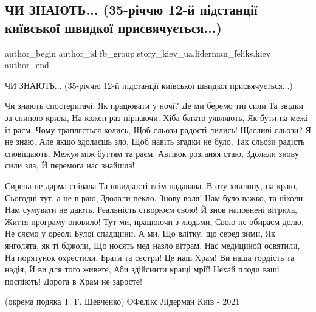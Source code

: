  
 
 
 
 
 
\subsection{ЧИ ЗНАЮТЬ... (35-річчю 12-й підстанції київської швидкої присвячується...)}
\label{sec:03_12_2021.fb.fb_group.story_kiev_ua.1.35_letie_skoraja}
 
\ifcmt
 author_begin
   author_id fb_group.story_kiev_ua,liderman_feliks.kiev
 author_end
\fi

ЧИ ЗНАЮТЬ... (35-річчю 12-й підстанції київської швидкої присвячується...)

\begin{multicols}{3} %
\setlength{\parindent}{0pt}
\obeycr
Чи знають спостеригачі, 
Як працювати у ночі?
Де ми беремо тиї сили
Та звідки за спиною крила, 
На кожен раз пірнаючи.
Хіба багато уявляють, 
Як бути на межі із раєм,
Чому трапляється колись, 
Щоб сльози радості лились! 
Щасливі сльози? Я не знаю. 
Але якщо здолаєшь зло, 
Щоб навіть згадки не було, 
Так сльози радість сповіщають.
Межуя між буттям та раєм, 
Автівок розганяя стаю, 
Здолали знову сили зла,
Й перемога нас знайшла!
\restorecr
\end{multicols} %


\begin{multicols}{3} %
\setlength{\parindent}{0pt}
\obeycr
Сирена не дарма співала
Та швидкості всім надавала. 
В оту хвилину, на краю, 
Сьогодні тут, а не в раю, 
Здолали пекло. Знову воля! 
Нам було важко, та ніколи 
Нам сумувати не дають. 
Реальність створюєм свою! 
Й знов наповнені вітрила, 
Життя програму оновило! 
Тут ми, працюючи з людьми, 
Свою не обираєм долю, 
Не сяємо у ореолі
Булої спадщини. А ми, 
Що влітку, що серед зими, 
Як янголята, як ті бджоли, 
Що носять мед назло вітрам. 
Нас медициной освятили, 
На порятунок охрестили. 
Брати та сестри! Це наш Храм!
Ви наша гордість та надія, 
Й ви для того живете, 
Аби здійснити кращі мрії! 
Нехай плоди ваші поспіють! 
Дорога в Храм не заросте! 
\restorecr
\end{multicols} %

(окрема подяка Т. Г. Шевченко) ©Фелікс Лідерман Київ - 2021

